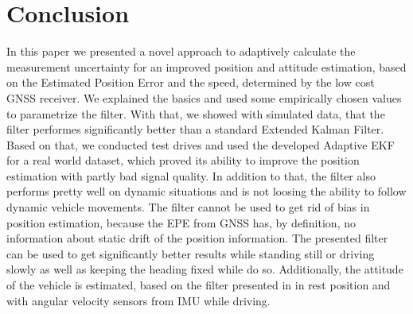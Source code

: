 \documentclass[conference]{IEEEtran}
\begin{document}
%





\section{Conclusion}
In this paper we presented a novel approach to adaptively calculate the measurement uncertainty for an improved position and attitude estimation, based on the Estimated Position Error and the speed, determined by the low cost GNSS receiver.
We explained the basics and used some empirically chosen values to parametrize the filter. With that, we showed with simulated data, that the filter performes significantly better than a standard Extended Kalman Filter. Based on that, we conducted test drives and used the developed Adaptive EKF for a real world dataset, which proved its ability to improve the position estimation with partly bad signal quality. In addition to that, the filter also performs pretty well on dynamic situations and is not loosing the ability to follow dynamic vehicle movements.
The filter cannot be used to get rid of bias in position estimation, because the EPE from GNSS has, by definition, no information about static drift of the position information.
The presented filter can be used to get significantly better results while standing still or driving slowly as well as keeping the heading fixed while do so.
Additionally, the attitude of the vehicle is estimated, based on the filter presented in \cite{Madgwick2010} in rest position and with angular velocity sensors from IMU while driving.
\end{document}
